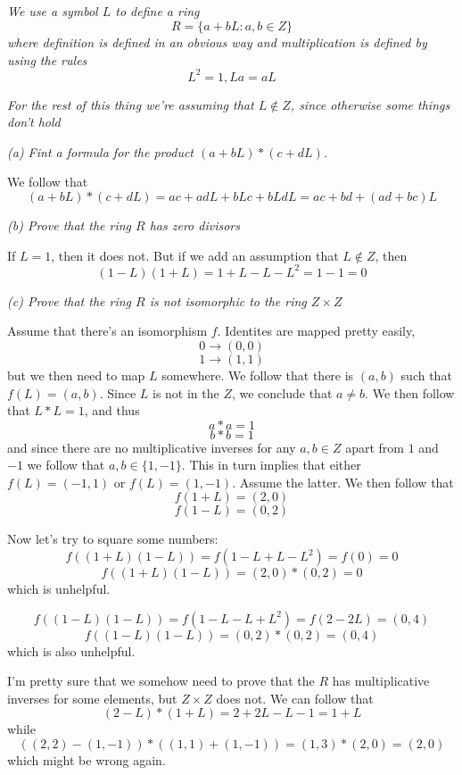 \documentclass[11pt,oneside,titlepage]{book}
\newcommand{\set}[1]{\{ #1 \}}
\begin{document}
\subsection{}

\textit{We use a symbol $L$ to define a ring
  $$R = \set{a + bL: a, b \in Z}$$
  where definition is defined in an obvious way and multiplication is defined
  by using the rules
  $$L^2 = 1, La = aL$$
}

\textit{For the rest of this thing we're assuming that $L \notin Z$, since
otherwise some things don't hold}

\textit{(a) Fint a formula for the product $(a + bL) * (c + dL)$.}

We follow that
$$(a + bL) * (c + dL) = ac + adL + bLc + bLdL = ac + bd + (ad + bc)L$$ 

\textit{(b) Prove that the ring $R$ has zero divisors}

If $L = 1$, then it does not. But if we add an assumption that $L \notin Z$,
then
$$(1 - L) (1 + L) = 1 + L - L - L^2 = 1 - 1 =  0$$

\textit{(c) Prove that the ring $R$ is not isomorphic to the ring $Z \times Z$}

Assume that there's an isomorphism $f$. Identites are mapped pretty
easily,
$$0 \to (0, 0)$$
$$1 \to (1, 1)$$
but we then need to map $L$ somewhere. We follow that there is $(a,
b)$ such that $f(L) = (a, b)$. Since $L$ is not in the $Z$, we
conclude that $a \neq b$. We then follow that $L * L = 1$, and thus
$$a * a = 1$$
$$b * b = 1$$
and since there are no multiplicative inverses for any $a, b \in Z$
apart from $1$ and $-1$ we follow that $a, b \in \set{1, -1}$.  This
in turn implies that either $f(L) = (-1, 1)$ or $f(L) = (1, -1)$.
Assume the latter. We then follow that
$$f(1 + L) = (2, 0)$$
$$f(1 - L) = (0, 2)$$

Now let's try to square some numbers:
$$f((1 + L)(1 - L)) = f(1 - L + L - L^2) = f(0) = 0$$
$$f((1 + L)(1 - L)) = (2, 0) * (0, 2) = 0$$
which is unhelpful.

$$f((1 - L)(1 - L)) = f(1 - L - L + L^2) = f(2 - 2L) = (0, 4)$$
$$f((1 - L)(1 - L)) = (0, 2) * (0, 2) = (0, 4)$$
which is also unhelpful.

I'm pretty sure that we somehow need to prove that the $R$ has
multiplicative inverses for some elements, but $Z \times Z$ does not.
We can follow that
$$(2 - L) * (1 + L) = 2 + 2L - L - 1 = 1 + L$$
while
$$((2, 2) - (1, -1)) * ((1, 1) + (1, -1)) = (1, 3) * (2, 0) = (2, 0)$$
which might be wrong again.
\end{document}
